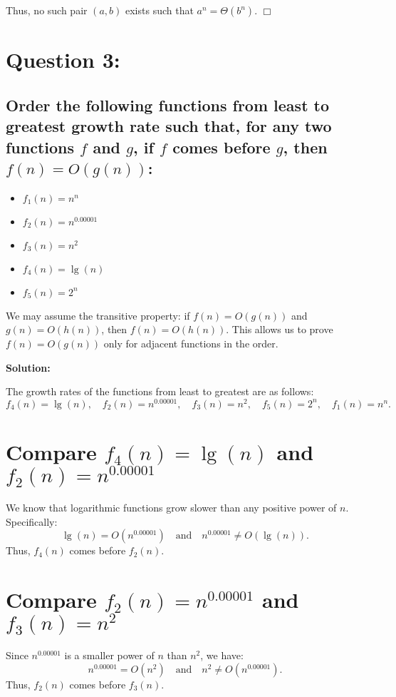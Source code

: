 \documentclass{article}
\begin{document}
Thus, no such pair \( (a, b) \) exists such that \( a^n = \Theta(b^n) \). \(\Box\)
\pagebreak

\section*{Question 3:}
\subsection*{Order the following functions from least to greatest growth rate such that, for any two functions \( f \) and \( g \), if \( f \) comes before \( g \), then \( f(n) = O(g(n)) \): }

\begin{itemize}
    \item \( f_1(n) = n^n \)
    \item \( f_2(n) = n^{0.00001} \)
    \item \( f_3(n) = n^2 \)
    \item \( f_4(n) = \lg(n) \)
    \item \( f_5(n) = 2^n \)
\end{itemize}

We may assume the transitive property: if \( f(n) = O(g(n)) \) and \( g(n) = O(h(n)) \), then \( f(n) = O(h(n)) \). This allows us to prove \( f(n) = O(g(n)) \) only for adjacent functions in the order.

\textbf{Solution:}  

The growth rates of the functions from least to greatest are as follows:  
\[
f_4(n) = \lg(n), \quad f_2(n) = n^{0.00001}, \quad f_3(n) = n^2, \quad f_5(n) = 2^n, \quad f_1(n) = n^n.
\]

\section*{Compare \( f_4(n) = \lg(n) \) and \( f_2(n) = n^{0.00001} \)}  
We know that logarithmic functions grow slower than any positive power of \( n \). Specifically:
\[
\lg(n) = O(n^{0.00001}) \quad \text{and} \quad n^{0.00001} \neq O(\lg(n)).
\]
Thus, \( f_4(n) \) comes before \( f_2(n) \).

\section*{Compare \( f_2(n) = n^{0.00001} \) and \( f_3(n) = n^2 \)}  
Since \( n^{0.00001} \) is a smaller power of \( n \) than \( n^2 \), we have:
\[
n^{0.00001} = O(n^2) \quad \text{and} \quad n^2 \neq O(n^{0.00001}).
\]
Thus, \( f_2(n) \) comes before \( f_3(n) \).
\end{document}
